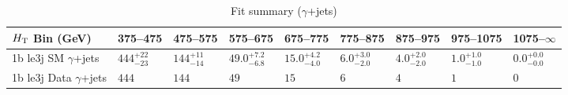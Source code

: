 \documentclass[8pt]{article}
\def\scalht{\mbox{$H_{\rm{T}}$}\xspace}
\newcommand\T{\rule{0pt}{2.6ex}}
\begin{document}
\begin{table}[ht!]
\caption{Fit summary ($\gamma$+jets)}
\label{tab:ensemble-summary}
\centering
\begin{tabular}{ lllllllll }

\hline
\scalht Bin (GeV)       & 375--475                       & 475--575                       & 575--675                       & 675--775                       & 775--875                       & 875--975                       & 975--1075                      & 1075--$\infty$                 \\ [1.000000ex]
\hline
1b le3j SM $\gamma$+jets\T & $444^{+22}_{-23}$              & $144^{+11}_{-14}$              & $49.0^{+7.2}_{-6.8}$           & $15.0^{+4.2}_{-4.0}$           & $6.0^{+3.0}_{-2.0}$            & $4.0^{+2.0}_{-2.0}$            & $1.0^{+1.0}_{-1.0}$            & $0.0^{+0.0}_{-0.0}$            \\ 
1b le3j Data $\gamma$+jets\T & $444$                          & $144$                          & $49$                           & $15$                           & $6$                            & $4$                            & $1$                            & $0$                            \\ 
\hline

\end{tabular}
\end{table}
\end{document}

